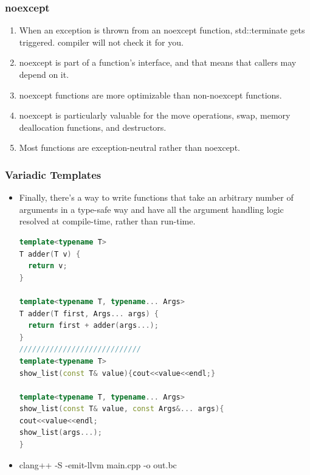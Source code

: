 \documentclass[a4paper,12pt,twoside]{book}
\begin{document}
\subsubsection{noexcept}

\begin{enumerate}

\item  When an exception is thrown from an noexcept function, std::terminate gets triggered. compiler will not check it for you.

\item noexcept is part of a function's interface, and that means that callers may
depend on it.

\item noexcept functions are more optimizable than non-noexcept functions.

\item noexcept is particularly valuable for the move operations, swap, memory deallocation functions, and destructors.

\item Most functions are exception-neutral rather than noexcept.

\end{enumerate}




\subsubsection{Variadic Templates}
\begin{itemize}
\item Finally, there's a way to write functions that take an arbitrary number of arguments in a type-safe way and have all the argument handling logic resolved at compile-time, rather than run-time.

\begin{lstlisting}[frame=single, language=c++]
template<typename T>
T adder(T v) {
  return v;
}

template<typename T, typename... Args>
T adder(T first, Args... args) {
  return first + adder(args...);
}
////////////////////////////
template<typename T>
show_list(const T& value){cout<<value<<endl;}

template<typename T, typename... Args>
show_list(const T& value, const Args&... args){
cout<<value<<endl;
show_list(args...);
}
\end{lstlisting}

\item clang++ -S -emit-llvm main.cpp -o out.bc


\end{itemize}



\end{document}
